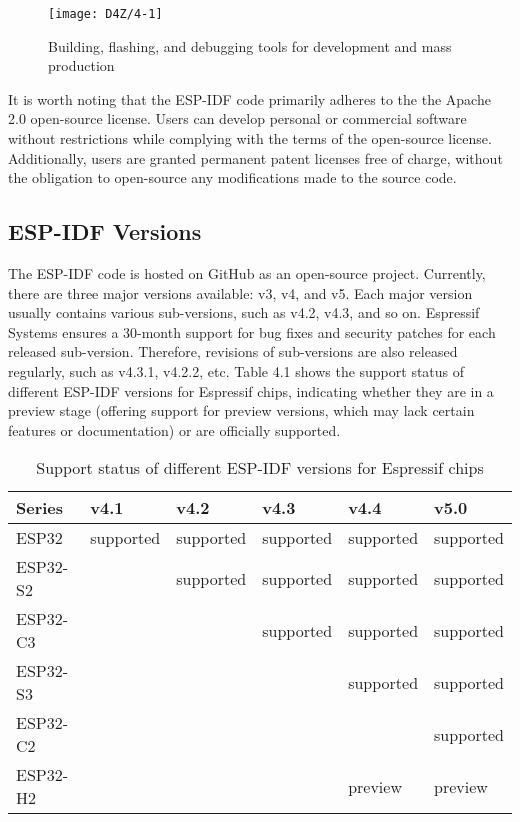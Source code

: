 \documentclass[a4paper,12pt]{book}
\begin{document}
\begin{figure}[h!]
    \centering
    \texttt{[image: D4Z/4-1]}
    \caption{\Centering Building, flashing, and debugging tools for development and mass production}
    \label{Building, flashing, and debugging tools for development and mass production}
\end{figure}

It is worth noting that the ESP-IDF code primarily adheres to the the Apache 2.0 open-source license. Users can develop personal or commercial software without restrictions while complying with the terms of the open-source license. Additionally, users are granted permanent patent licenses free of charge, without the obligation to open-source any modifications made to the source code.

\subsection{ESP-IDF Versions}
The ESP-IDF code is hosted on GitHub as an open-source project. Currently, there are three major versions available: v3, v4, and v5. Each major version usually contains various sub-versions, such as v4.2, v4.3, and so on. Espressif Systems ensures a 30-month support for bug fixes and security patches for each released sub-version. Therefore, revisions of sub-versions are also released regularly, such as v4.3.1, v4.2.2, etc. Table 4.1 shows the support status of different ESP-IDF versions for Espressif chips, indicating whether they are in a preview stage (offering support for preview versions, which may lack certain features or documentation) or are officially supported.

\begin{table}[h!]
    \renewcommand{\arraystretch}{1.5}
    \caption{Support status of different ESP-IDF versions for Espressif chips}
    \begin{tabular}{|>{\Centering}m{5.5em}|>{\Centering}m{6.3em}|>{\Centering}m{6.3em}|>{\Centering}m{6.3em}|>{\Centering}m{6.3em}|>{\Centering}m{6.3em}|}
        \hline
        \rowcolor{LightBlue} \textbf{Series}&\textbf{v4.1}&\textbf{v4.2}&\textbf{v4.3}&\textbf{v4.4}&\textbf{v5.0}\\
        \hline
        ESP32&supported&supported&supported&supported&supported\\
        \hline
        ESP32-S2&&supported&supported&supported&supported\\
        \hline
        ESP32-C3&&&supported&supported&supported\\
        \hline
        ESP32-S3&&&&supported&supported\\
        \hline
        ESP32-C2&&&&&supported\\
        \hline
        ESP32-H2&&&&preview&preview\\
        \hline
    \end{tabular}
\end{table}
\end{document}
